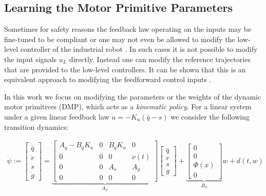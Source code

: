 \documentclass[10pt,a4paper]{article}
\newcommand{\joint}{q} %
\newcommand{\state}{\bar{\joint}} %
\newcommand{\dmp}{s} %
\newcommand{\traj}{r} %
\newcommand{\linDist}{d} %
\newcommand{\sysInput}{u} %
\newcommand{\fullvec}{\psi} %
\newcommand{\phase}{x} %
\newcommand{\weights}{w} %
\newcommand{\basis}{\Phi} %
\begin{document}
\subsection{Learning the Motor Primitive Parameters}

Sometimes for safety reasons the feedback law operating on the inputs may be fine-tuned to be compliant or one may not even be allowed to modify the low-level controller of the industrial robot \cite{Longman2000}. In such cases it is not possible to modify the input signals $\sysInput_L$ directly. Instead one can modify the reference trajectories that are provided to the low-level controllers. It can be shown that this is an equivalent approach to modifying the feedforward control inputs \cite{Bristow06}.

In this work we focus on modifying the parameters or the weights of the dynamic motor primitives (DMP), which acts as a \emph{kinematic policy}. For a linear system under a given linear feedback law $\sysInput = -K_u(\state - \dmp)$ we consider the following transition dynamics:

\begin{equation*}
\begin{aligned}
 \dot{\fullvec} := 
 \begin{bmatrix}
  \dot{\state} \\
  \dot{\traj} \\
  \dot{\dmp} \\
  \dot{g}
 \end{bmatrix} = 
 \underbrace{\begin{bmatrix}
  A_q - B_qK_u & 0 & B_qK_u & 0 \\
  0 & 0 & 0 & \nu(t) \\
  0  & 0  & A_s & A_g  \\
  0 & 0 & 0 & 0
 \end{bmatrix}}_{A_{\fullvec}}
 \begin{bmatrix}
   \state \\
   \traj \\
   \dmp \\
   g
  \end{bmatrix} +
  \underbrace{\begin{bmatrix}
    0 \\
    0 \\
    \basis(\phase) \\
    0
   \end{bmatrix}}_{B_{\fullvec}} \weights + \linDist(t,\weights)
\end{aligned}
\end{equation*}
\end{document}
